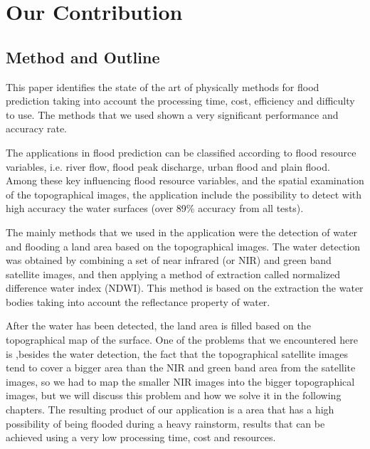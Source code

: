 \documentclass[12pt, a4paper]{report}
\begin{document}
\section{Our Contribution}
\subsection{Method and Outline}

\quad
This paper identifies the state of the art of physically methods for flood prediction taking into account the processing time, cost, efficiency and difficulty to use. The methods that we used shown a very significant performance and accuracy rate.
\par

The applications in flood prediction can be classified according to flood resource variables, i.e. river flow, flood peak discharge, urban flood and plain flood. Among these key influencing flood resource variables, and the spatial examination of the topographical images, the application include the possibility to detect with high accuracy the water surfaces (over 89\% accuracy from all tests).
\par

The mainly methods that we used in the application were the detection of water and flooding a land area based on the topographical images. The water detection was obtained by combining a set of near infrared (or NIR) and green band satellite images, and then applying a method of extraction called normalized difference water index (NDWI). This method is based on the extraction the water bodies taking into account the reflectance property of water.
\par 

After the water has been detected, the land area is filled based on the topographical map of the surface. One of the problems that we encountered here is ,besides the water detection, the fact that the topographical satellite images tend to cover a bigger area than the NIR and green band area from the satellite images, so we had to map the smaller NIR images into the bigger topographical images, but we will discuss this problem and how we solve it in the following chapters. The resulting product of our application is a area that has a high possibility of being flooded during a heavy rainstorm, results that can be achieved using a very low processing time, cost and resources.
\par 
\end{document}
